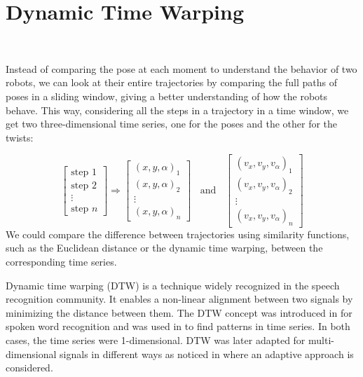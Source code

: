\documentclass{article}
\begin{document}
\section{Dynamic Time Warping}~\label{sec:DTW}

Instead of comparing the pose 
at each moment to understand the behavior of two robots, we can look at their entire trajectories by comparing the full paths of poses 
in a sliding window, giving a better understanding of how the robots behave. 
This way, considering all the steps in a trajectory in a time window, we get two three-dimensional time series, one for the poses and the other for the twists:

\[
\left[\begin{array}{c}
\mbox{step } 1\\
\mbox{step } 2\\
\vdots
\\
\mbox{step } n
\end{array} 
\right] \Rightarrow 
\left[\begin{array}{c}
(x,y,\alpha)_1\\
(x,y,\alpha)_2\\
\vdots
\\
(x,y,\alpha)_n
\end{array} 
\right]\;\;
\mbox{ and }\;\;
\left[\begin{array}{c}
(v_x,v_y,v_{\alpha})_1\\
(v_x,v_y,v_{\alpha})_2\\
\vdots
\\
(v_x,v_y,v_{\alpha})_n
\end{array} 
\right]
\]
We could compare the difference between trajectories using similarity functions, such as the Euclidean distance or the dynamic time warping, between the corresponding time series. 


Dynamic time warping (DTW) is a technique widely recognized in the speech recognition community. It enables a non-linear alignment between two signals by minimizing the distance between them. 
The DTW concept was introduced in \cite{DTW-classic}
for spoken word recognition and was used in \cite{DTW-second}
to find patterns in time series. In both cases, the time series were 1-dimensional. 
DTW was later adapted for multi-dimensional signals in different ways as noticed in \cite{adaptative-dtw} where an adaptive approach is considered. 
\end{document}
